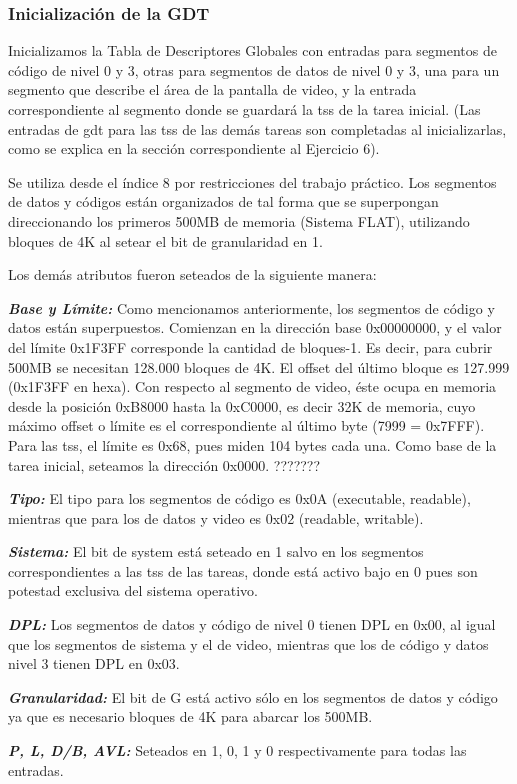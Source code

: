 \subsubsection*{Inicialización de la GDT}

Inicializamos la Tabla de Descriptores Globales con entradas para segmentos de código de nivel 0 y 3, otras para segmentos de datos de nivel 0 y 3, una para un segmento que describe el área de la pantalla de video, y la entrada correspondiente al segmento donde se guardará la tss de la tarea inicial. (Las entradas de gdt para las tss de las demás tareas son completadas al inicializarlas, como se explica en la sección correspondiente al Ejercicio 6).

\par Se utiliza desde el índice 8 por restricciones del trabajo práctico.
Los segmentos de datos y códigos están organizados de tal forma que se superpongan direccionando los primeros 500MB de memoria (Sistema FLAT), utilizando bloques de 4K al setear el bit de granularidad en 1.
\par Los demás atributos fueron seteados de la siguiente manera:
\par \textbf{\emph{Base y Límite: } }Como mencionamos anteriormente, los segmentos de código y datos están superpuestos. Comienzan en la dirección base 0x00000000, y el valor del límite 0x1F3FF corresponde la cantidad de bloques-1. Es decir, para cubrir 500MB se necesitan 128.000 bloques de 4K. El offset del último bloque es 127.999 (0x1F3FF en hexa).
Con respecto al segmento de video, éste ocupa en memoria desde la posición 0xB8000 hasta la 0xC0000, es decir 32K de memoria, cuyo máximo offset o límite es el correspondiente al último byte (7999 = 0x7FFF).
Para las tss, el límite es 0x68, pues miden 104 bytes cada una. Como base de la tarea inicial, seteamos la dirección 0x0000. ???????
\par \emph{\textbf{Tipo: }} El tipo para los segmentos de código es 0x0A (executable, readable), mientras que para los de datos y video es 0x02 (readable, writable).
\par \emph{\textbf{Sistema: }} El bit de system está seteado en 1 salvo en los segmentos correspondientes a las tss de las tareas, donde está activo bajo en 0 pues son potestad exclusiva del sistema operativo.
\par \emph{\textbf{DPL: }} Los segmentos de datos y código de nivel 0 tienen DPL en 0x00, al igual que los segmentos de sistema y el de video, mientras que los de código y datos nivel 3 tienen DPL en 0x03.
\par \emph{\textbf{Granularidad: }} El bit de G está activo sólo en los segmentos de datos y código ya que es necesario bloques de 4K para abarcar los 500MB.
\par \emph{\textbf{P, L, D/B, AVL: } }Seteados en 1, 0, 1 y 0 respectivamente para todas las entradas.
\newline

